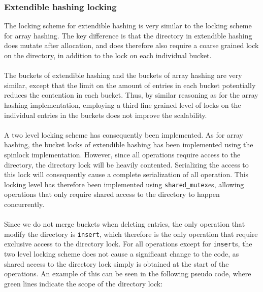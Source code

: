 \documentclass[11pt]{article} %
\begin{document}
\subsubsection{Extendible hashing locking}
\label{subsubsec:design_extendible_hashing_locking}
The locking scheme for extendible hashing is very similar to the locking scheme for array hashing. The key difference is that the directory in extendible hashing does mutate after allocation, and does therefore also require a coarse grained lock on the directory, in addition to the lock on each individual bucket. \\
\\
The buckets of extendible hashing and the buckets of array hashing are very similar, except that the limit on the amount of entries in each bucket potentially reduces the contention in each bucket. Thus, by similar reasoning as for the array hashing implementation, employing a third fine grained level of locks on the individual entries in the buckets does not improve the scalability.\\
\\
A two level locking scheme has consequently been implemented. As for array hashing, the bucket locks of extendible hashing has been implemented using the spinlock implementation. However, since all operations require access to the directory, the directory lock will be heavily contented. Serializing the access to this lock will consequently cause a complete serialization of all operation. This locking level has therefore been implemented using \verb|shared_mutex|es, allowing operations that only require shared access to the directory to happen concurrently. \\
\\
Since we do not merge buckets when deleting entries, the only operation that modify the directory is \verb|insert|, which therefore is the only operation that require exclusive access to the directory lock. For all operations except for \verb|insert|s, the two level locking scheme does not cause a significant change to the code, as shared access to the directory lock simply is obtained at the start of the operations. An example of this can be seen in the following pseudo code, where green lines indicate the scope of the directory lock:\\
\\
\end{document}

